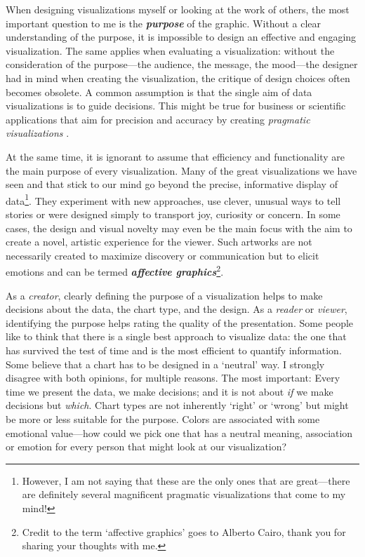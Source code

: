 \documentclass[
]{krantz}
\begin{document}
When designing visualizations myself or looking at the work of others, the most important question to me is the \textbf{\emph{purpose}} of the graphic. Without a clear understanding of the purpose, it is impossible to design an effective and engaging visualization. The same applies when evaluating a visualization: without the consideration of the purpose---the audience, the message, the mood---the designer had in mind when creating the visualization, the critique of design choices often becomes obsolete. A common assumption is that the single aim of data visualizations is to guide decisions. This might be true for business or scientific applications that aim for precision and accuracy by creating \emph{pragmatic visualizations} \citep{kosara2007}.

At the same time, it is ignorant to assume that efficiency and functionality are the main purpose of every visualization. Many of the great visualizations we have seen and that stick to our mind go beyond the precise, informative display of data\footnote{However, I am not saying that these are the only ones that are great---there are definitely several magnificent pragmatic visualizations that come to my mind!}. They experiment with new approaches, use clever, unusual ways to tell stories or were designed simply to transport joy, curiosity or concern. In some cases, the design and visual novelty may even be the main focus with the aim to create a novel, artistic experience for the viewer. Such artworks are not necessarily created to maximize discovery or communication but to elicit emotions and can be termed \textbf{\emph{affective graphics}}\footnote{Credit to the term `affective graphics' goes to Alberto Cairo, thank you for sharing your thoughts with me.}.

As a \emph{creator}, clearly defining the purpose of a visualization helps to make decisions about the data, the chart type, and the design. As a \emph{reader} or \emph{viewer}, identifying the purpose helps rating the quality of the presentation. Some people like to think that there is a single best approach to visualize data: the one that has survived the test of time and is the most efficient to quantify information. Some believe that a chart has to be designed in a `neutral' way. I strongly disagree with both opinions, for multiple reasons. The most important: Every time we present the data, we make decisions; and it is not about \emph{if} we make decisions but \emph{which}. Chart types are not inherently `right' or `wrong' but might be more or less suitable for the purpose. Colors are associated with some emotional value---how could we pick one that has a neutral meaning, association or emotion for every person that might look at our visualization?
\end{document}
